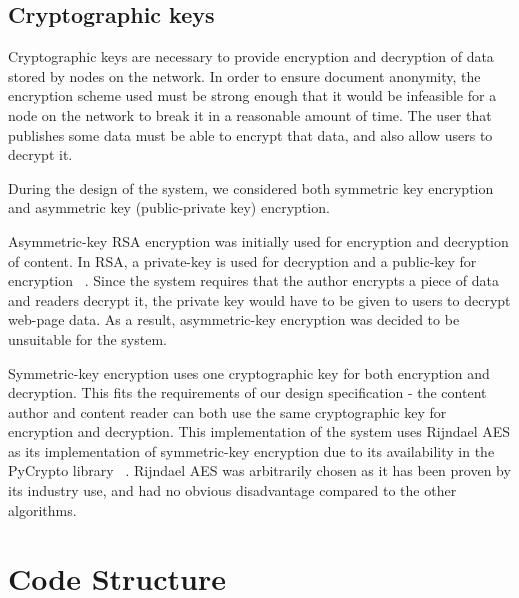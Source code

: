 \subsection{Cryptographic keys}

Cryptographic keys are necessary to provide encryption and decryption of data stored by nodes on the network. In order to ensure document anonymity,
the encryption scheme used must be strong enough that it would be infeasible for a node on the network to break it in a reasonable amount of time. The user that publishes some data must be able to encrypt that data, and also allow users to decrypt it.

During the design of the system, we considered both symmetric key encryption and asymmetric key (public-private key) encryption.

Asymmetric-key RSA encryption was initially used for encryption and decryption of content. In RSA, a private-key is used for 
decryption and a public-key for encryption ~\cite{rsa}. Since the system requires that the author encrypts a piece of data and readers decrypt it, the private key would have to be given to users to decrypt web-page data. As a result, asymmetric-key
encryption was decided to be unsuitable for the system.

Symmetric-key encryption uses one cryptographic key for both encryption and decryption. This fits the requirements of our design
specification - the content author and content reader can both use the same cryptographic key for encryption and decryption.
This implementation of the system uses Rijndael AES as its implementation of symmetric-key encryption due to its availability
in the PyCrypto library ~\cite{pycrypto}. Rijndael AES was arbitrarily chosen as it has been proven by its industry use, and had no obvious disadvantage compared to the other algorithms.

\section{Code Structure}


